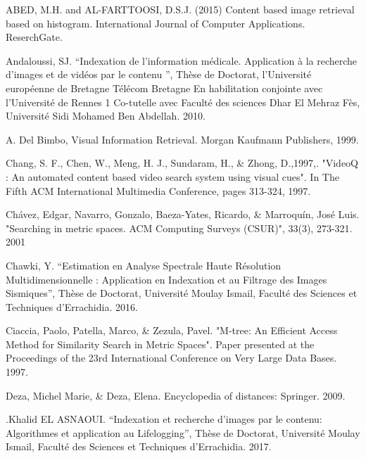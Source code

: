 \documentclass[
openany,
11pt, %
french, %
singlespacing, %
headsepline, %
]{MastersDoctoralThesis} %
\begin{document}
{

\hypersetup{
	colorlinks=false,       %
}

}
\begin{thebibliography}{widest entry}
	  ABED, M.H.   and AL-FARTTOOSI, D.S.J. (2015) Content    based image retrieval based on histogram. International Journal of Computer Applications. ReserchGate. 
	
	  Andaloussi, SJ. “Indexation de l’information médicale. Application à la recherche d’images et de vidéos par le contenu ”, Thèse de Doctorat, l’Université européenne de Bretagne Télécom Bretagne En habilitation conjointe avec l’Université de Rennes 1 Co-tutelle avec Faculté des sciences Dhar El Mehraz Fès, Université Sidi Mohamed Ben Abdellah.
	2010.
	
	 A. Del Bimbo, Visual Information Retrieval. Morgan Kaufmann Publishers, 1999.
	
	 Chang, S. F., Chen, W., Meng, H. J., Sundaram, H., \& Zhong, D.,1997,. "VideoQ : An automated content based video search system using visual cues". In The Fifth ACM International Multimedia Conference, pages 313-324, 1997.
	
	 Chávez, Edgar, Navarro, Gonzalo, Baeza-Yates, Ricardo, \& Marroquín, José Luis. "Searching in metric spaces. ACM Computing Surveys (CSUR)", 33(3), 273-321. 2001
	
	 Chawki, Y. “Estimation en Analyse Spectrale Haute Résolution Multidimensionnelle : Application en Indexation et au Filtrage des Images Sismiques”, Thèse de Doctorat, Université Moulay Ismail, Faculté des Sciences et Techniques d’Errachidia. 2016.
	
	
	  Ciaccia, Paolo, Patella, Marco, \& Zezula, Pavel. "M-tree: An Efficient Access Method for Similarity Search in Metric Spaces". Paper presented at the Proceedings of the 23rd International Conference on Very Large Data Bases. 1997.
	
	
	 Deza, Michel Marie, \& Deza, Elena. Encyclopedia of distances: Springer. 2009.
	
	 .Khalid EL ASNAOUI. “Indexation et recherche d’images par le contenu: Algorithmes et application au Lifelogging”, Thèse
	de Doctorat, Université Moulay Ismail, Faculté des Sciences et Techniques d’Errachidia. 2017.
	

\end{thebibliography}
\end{document}
